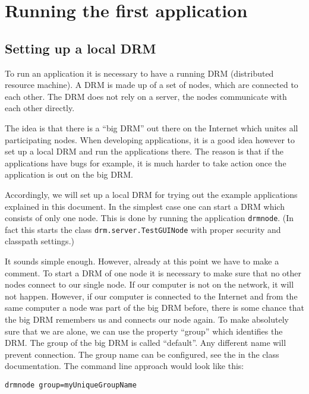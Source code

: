 \documentclass{article}
\begin{document}
\section{Running the first application}
\label{sec:hello}

\subsection{Setting up a local DRM}
\label{sec:drm1}

To run an application it is necessary to have a running DRM (distributed
resource machine).
A DRM is made up of a set of nodes, which are connected to each other.
The DRM does not rely on a server, the nodes communicate with each other
directly.

The idea is that there is a ``big DRM'' out there on the Internet which
unites all participating nodes.
When developing applications, it is a good idea however to set up a local DRM
and run the applications there.
The reason is that if the applications have bugs for example, it is much
harder to take action once the application is out on the big DRM.

Accordingly, we will set up a local DRM for trying out the example
applications explained in this document.
In the simplest case one can start a DRM which consists of only one node.
This is done by running the application {\tt drmnode}.
(In fact this starts the class {\tt drm.server.TestGUINode} with proper
security and classpath settings.)

It sounds simple enough.
However, already at this point we have to make a comment.
To start a DRM of one node it is necessary to make sure that no other nodes
connect to our single node.
If our computer is not on the network, it will not happen.
However, if our computer is connected to the Internet and from the same
computer a node was part of the big DRM before, there is some chance that
the big DRM remembers us and connects our node again.
To make absolutely sure that we are alone, we can use the property
``group'' which identifies the DRM.
The group of the big DRM is called ``default''. 
Any different name will prevent connection.
The group name can be configured, see the
in the class documentation.
The command line approach would look like this:
\begin{verbatim}
drmnode group=myUniqueGroupName
\end{verbatim}
\end{document}
